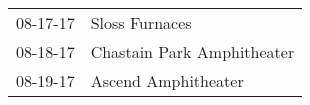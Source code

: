 \begin{supertabular}{p{0.07\textwidth}p{0.23\textwidth}}
 08-17-17 &              Sloss Furnaces \\
 08-18-17 &  Chastain Park Amphitheater \\
 08-19-17 &         Ascend Amphitheater \\
\end{supertabular}
